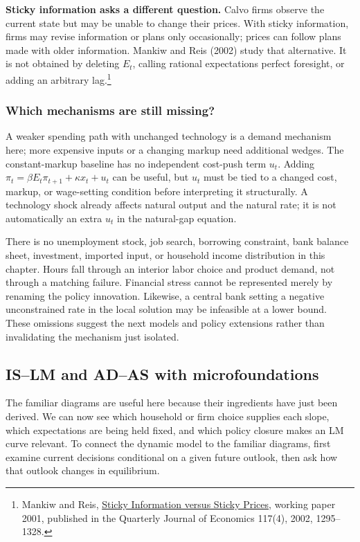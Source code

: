 \begin{blueblock}
\textbf{Sticky information asks a different question.}
Calvo firms observe the current state but may be unable to change their prices.
With sticky information, firms may revise information or plans only occasionally;
prices can follow plans made with older information. Mankiw and Reis (2002)
study that alternative. It is not obtained by deleting $E_t$, calling rational
expectations perfect foresight, or adding an arbitrary lag.\footnote{Mankiw
and Reis, \href{https://www.nber.org/papers/w8290}{Sticky Information versus
Sticky Prices}, working paper 2001, published in the Quarterly Journal of
Economics 117(4), 2002, 1295--1328.}
\end{blueblock}

\subsubsection{Which mechanisms are still missing?}

A weaker spending path with unchanged technology is a demand mechanism here;
more expensive inputs or a changing markup need additional wedges. The
constant-markup baseline has no independent cost-push term $u_t$. Adding
$\pi_t=\beta E_t\pi_{t+1}+\kappa x_t+u_t$ can be useful, but $u_t$ must
be tied to a changed cost, markup, or wage-setting condition before interpreting
it structurally. A technology shock already affects natural output and the
natural rate; it is not automatically an extra $u_t$ in the natural-gap equation.

There is no unemployment stock, job search, borrowing constraint, bank balance
sheet, investment, imported input, or household income distribution in this
chapter. Hours fall through an interior labor choice and product demand, not
through a matching failure. Financial stress cannot be represented merely by
renaming the policy innovation. Likewise, a central bank setting a negative
unconstrained rate in the local solution may be infeasible at a lower bound.
These omissions suggest the next models and policy extensions rather than
invalidating the mechanism just isolated.

\subsection{IS--LM and AD--AS with microfoundations}
\label{sec:nk-islm-adas}

The familiar diagrams are useful here because their ingredients have just
been derived. We can now see which household or firm choice supplies each
slope, which expectations are being held fixed, and which policy closure makes
an LM curve relevant. To connect the dynamic model to the familiar diagrams,
first examine current decisions conditional on a given future outlook, then
ask how that outlook changes in equilibrium.

